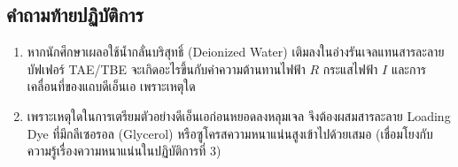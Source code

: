 \subsection{คำถามท้ายปฏิบัติการ}
\begin{enumerate}
    \item หากนักศึกษาเผลอใช้น้ำกลั่นบริสุทธิ์ (Deionized Water) เติมลงในอ่างรันเจลแทนสารละลายบัฟเฟอร์ TAE/TBE จะเกิดอะไรขึ้นกับค่าความต้านทานไฟฟ้า $R$ กระแสไฟฟ้า $I$ และการเคลื่อนที่ของแถบดีเอ็นเอ เพราะเหตุใด
    \item เพราะเหตุใดในการเตรียมตัวอย่างดีเอ็นเอก่อนหยอดลงหลุมเจล จึงต้องผสมสารละลาย Loading Dye ที่มีกลีเซอรอล (Glycerol) หรือซูโครสความหนาแน่นสูงเข้าไปด้วยเสมอ (เชื่อมโยงกับความรู้เรื่องความหนาแน่นในปฏิบัติการที่ 3)
\end{enumerate}
